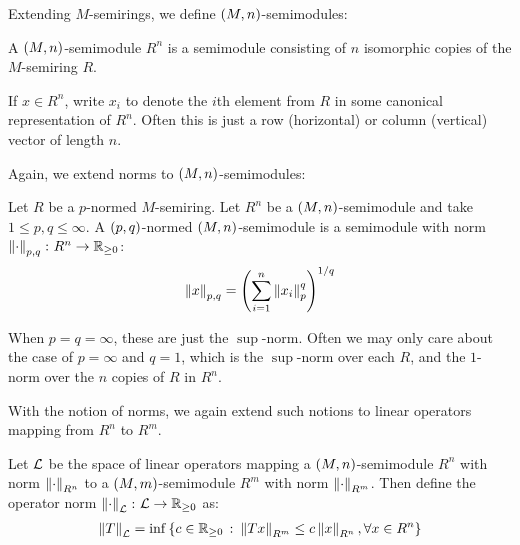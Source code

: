 Extending \(M\)-semirings,
we define \(\left(M, n\right)\)-semimodules:

\begin{definition}
  A \(\left(M, n\right)\)-semimodule \(R ^n\)
  is a semimodule consisting of \(n\) isomorphic copies of
  the \(M\)-semiring \(R\).
\end{definition}

If \(x \in R ^n\), write \(x_i\) to denote the \(i\)th element from
\(R\) in some canonical representation of \(R ^n\).
Often this is just a row (horizontal) or column (vertical)
vector of length \(n\).

Again, we extend norms to \(\left(M, n\right)\)-semimodules:

\begin{definition}
  Let \(R\) be a \(p\)-normed \(M\)-semiring.
  Let \(R ^n\) be a \(\left(M, n\right)\)-semimodule
  and take \(1 \leq p, q \leq \infty\).
  A \(\left(p, q\right)\)-normed \(\left(M, n\right)\)-semimodule
  is a semimodule with norm \(\left\lVert\cdot\right\rVert_{p, q} \colon R^n \to \mathbb{R}_{\geq 0}\):
  \begin{align*}
    \left\lVert x\right\rVert_{p, q}
      = \left(\sum_{i = 1}^{n} \left\lVert x_i\right\rVert_{p}^q\right)^{1 / q}
  \end{align*}
\end{definition}

When \(p = q = \infty\), these are just the \(\sup\)-norm.
Often we may only care about the case of \(p = \infty\) and \(q = 1\),
which is the \(\sup\)-norm over each \(R\),
and the \(1\)-norm over the \(n\) copies of \(R\) in \(R^n\).

With the notion of norms, we again extend such notions to
linear operators mapping from \(R^n\) to \(R^m\).

\begin{definition}
  Let \(\mathcal{L}\) be the space of linear operators mapping
  a \(\left(M, n\right)\)-semimodule \(R^n\) with norm \(\left\lVert\cdot\right\rVert_{R^n}\)
  to a \(\left(M, m\right)\)-semimodule \(R^m\) with norm \(\left\lVert\cdot\right\rVert_{R^m}\).
  Then define the operator norm
  \(\left\lVert\cdot\right\rVert_{\mathcal{L}} \colon \mathcal{L} \to \mathbb{R}_{\geq 0}\) as:
  \begin{align*}
    \left\lVert T\right\rVert_{\mathcal{L}} =
      \inf \left\{c \in \mathbb{R}_{\geq 0} \ \colon
              \left\lVert Tx\right\rVert_{R^m}
                \leq c \left\lVert x\right\rVert_{R^n},
              \forall x \in R^n\right\}
  \end{align*}
\end{definition}


